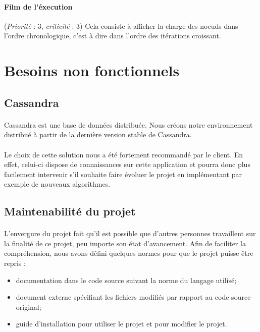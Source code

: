 \documentclass[12pt]{article}
\newcommand{\besoin}[2] {
  (\textit{Priorité} : #1, \textit{criticité} : #2)
}
\begin{document}
\paragraph{Film de l'éxecution} \besoin{3}{3} Cela consiste à afficher la charge des noeuds dans l'ordre chronologique, c'est à dire dans l'ordre des itérations croissant.


\newpage

\section{Besoins non fonctionnels}

\subsection{Cassandra}

\paragraph{} Cassandra est une base de données distribuée.
Nous créons notre environnement distribué à partir de la dernière version stable de Cassandra.

\paragraph{} Le choix de cette solution nous a été fortement recommandé par le client.
En effet, celui-ci dispose de connaissances sur cette application et pourra donc plus facilement intervenir s'il souhaite faire évoluer le projet en implémentant par exemple de nouveaux algorithmes.

\subsection{Maintenabilité du projet}

\paragraph{} L'envergure du projet fait qu'il est possible que d'autres personnes travaillent sur la finalité de ce projet, peu importe son état d'avancement.
Afin de faciliter la compréhension, nous avons défini quelques normes pour que le projet puisse être repris :
\begin{itemize}
	\item documentation dans le code source suivant la norme du langage utilisé;
	\item document externe spécifiant les fichiers modifiés par rapport au code source original;
	\item guide d'installation pour utiliser le projet et pour modifier le projet.
\end{itemize}
\end{document}
